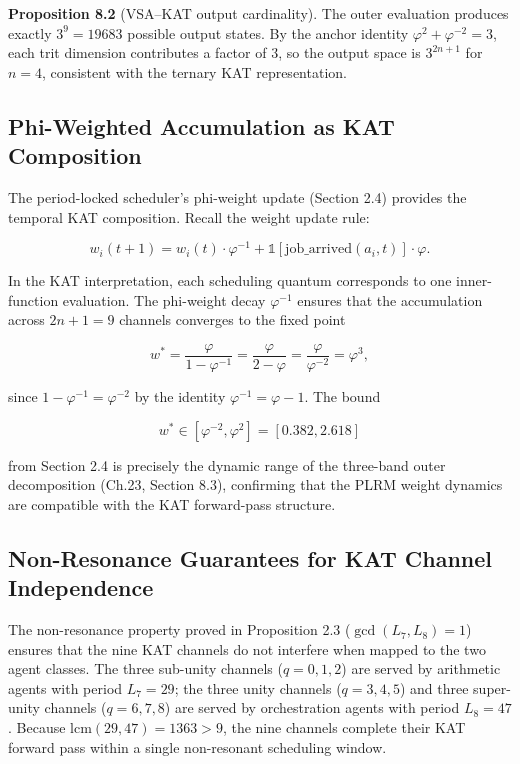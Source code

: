 \textbf{Proposition 8.2} (VSA--KAT output
cardinality). The outer evaluation produces exactly
\(3^9 = 19683\) possible output states. By the
anchor identity \(\varphi^2 + \varphi^{-2} = 3\),
each trit dimension contributes a factor of \(3\),
so the output space is \(3^{2n+1}\) for
\(n = 4\), consistent with the ternary KAT
representation.

\subsection{Phi-Weighted Accumulation as KAT
Composition}\label{fa_24:phi-weighted-accumulation}

The period-locked scheduler's phi-weight update
(Section 2.4) provides the temporal KAT
composition. Recall the weight update rule:

\[
w_i(t+1) = w_i(t) \cdot \varphi^{-1} + \mathbb{1}[\text{job\_arrived}(a_i, t)] \cdot \varphi.
\]

In the KAT interpretation, each scheduling quantum
corresponds to one inner-function evaluation.
The phi-weight decay \(\varphi^{-1}\) ensures that
the accumulation across \(2n+1 = 9\) channels
converges to the fixed point

\[
w^* = \frac{\varphi}{1 - \varphi^{-1}} = \frac{\varphi}{2 - \varphi} = \frac{\varphi}{\varphi^{-2}} = \varphi^3,
\]

since \(1 - \varphi^{-1} = \varphi^{-2}\) by the
identity \(\varphi^{-1} = \varphi - 1\). The bound

\[
w^* \in [\varphi^{-2}, \varphi^2] = [0.382, 2.618]
\]

from Section 2.4 is precisely the dynamic range of
the three-band outer decomposition (Ch.23, Section
8.3), confirming that the PLRM weight dynamics are
compatible with the KAT forward-pass structure.

\subsection{Non-Resonance Guarantees for KAT
Channel
Independence}\label{fa_24:non-resonance-kat}

The non-resonance property proved in Proposition 2.3
(\(\gcd(L_7, L_8) = 1\)) ensures that the nine KAT
channels do not interfere when mapped to the two
agent classes. The three sub-unity channels
(\(q = 0, 1, 2\)) are served by arithmetic agents
with period \(L_7 = 29\); the three unity channels
(\(q = 3, 4, 5\)) and three super-unity channels
(\(q = 6, 7, 8\)) are served by orchestration
agents with period \(L_8 = 47\). Because
\(\mathrm{lcm}(29, 47) = 1363 > 9\), the nine
channels complete their KAT forward pass within a
single non-resonant scheduling window.

